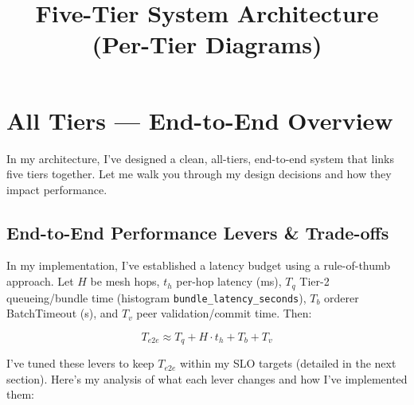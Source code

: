 \documentclass[12pt]{article}
\title{Five-Tier System Architecture (Per-Tier Diagrams)}
\author{}
\date{}
\begin{document}
\maketitle



\section{All Tiers — End-to-End Overview}

In my architecture, I've designed a clean, all-tiers, end-to-end system that links five tiers together. Let me walk you through my design decisions and how they impact performance.

\subsection{End-to-End Performance Levers \& Trade-offs}

In my implementation, I've established a latency budget using a rule-of-thumb approach. Let \(H\) be mesh hops, \(t_h\) per-hop latency (ms), \(T_q\) Tier-2 queueing/bundle time (histogram \texttt{bundle\_latency\_seconds}), \(T_b\) orderer BatchTimeout (s), and \(T_v\) peer validation/commit time. Then:

\[
T_{e2e} \approx T_q + H \cdot t_h + T_b + T_v
\]

I've tuned these levers to keep \(T_{e2e}\) within my SLO targets (detailed in the next section). Here's my analysis of what each lever changes and how I've implemented them:
\end{document}
